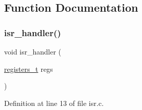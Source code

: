\subsection{Function Documentation}
\mbox{\label{a00095_a700e3ca056bf69296370f504f2cb6cc8_a700e3ca056bf69296370f504f2cb6cc8}} 
\subsubsection{\texorpdfstring{isr\+\_\+handler()}{isr\_handler()}}
{\footnotesize\ttfamily void isr\+\_\+handler (\begin{DoxyParamCaption}\item[{\hyperlink{a00095_adf58dbaf6139b4957c348711f2026957_adf58dbaf6139b4957c348711f2026957}{registers\+\_\+t}}]{regs }\end{DoxyParamCaption})}



Definition at line 13 of file isr.\+c.


